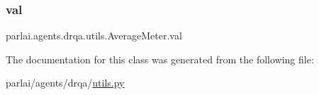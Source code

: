 \subsubsection{\texorpdfstring{val}{val}}
{\footnotesize\ttfamily parlai.\+agents.\+drqa.\+utils.\+Average\+Meter.\+val}



The documentation for this class was generated from the following file\+:\begin{DoxyCompactItemize}
\item 
parlai/agents/drqa/\hyperlink{parlai_2agents_2drqa_2utils_8py}{utils.\+py}\end{DoxyCompactItemize}
